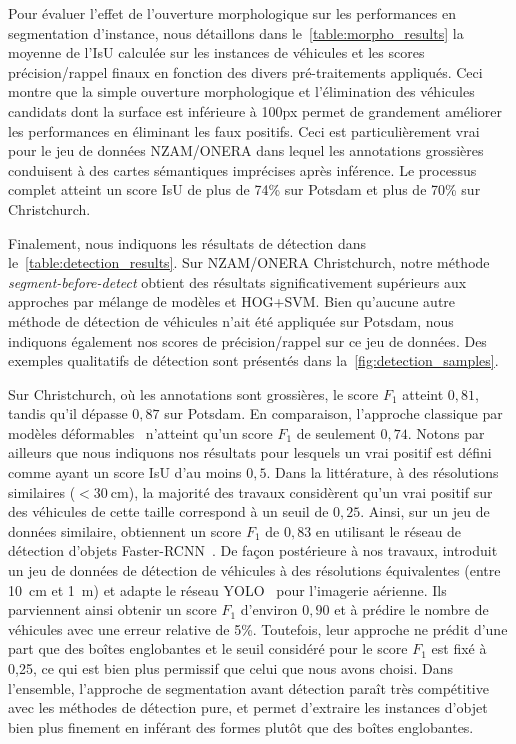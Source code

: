 Pour évaluer l'effet de l'ouverture morphologique sur les performances en segmentation d'instance, nous détaillons dans le~\cref{table:morpho_results} la moyenne de l'\gls{IsU} calculée sur les instances de véhicules et les scores précision/rappel finaux en fonction des divers pré-traitements appliqués. Ceci montre que la simple ouverture morphologique et l'élimination des véhicules candidats dont la surface est inférieure à 100px permet de grandement améliorer les performances en éliminant les faux positifs. Ceci est particulièrement vrai pour le jeu de données NZAM/ONERA dans lequel les annotations grossières conduisent à des cartes sémantiques imprécises après inférence. Le processus complet atteint un score \gls{IsU} de plus de 74\% sur Potsdam et plus de 70\% sur Christchurch.

Finalement, nous indiquons les résultats de détection dans le~\cref{table:detection_results}. Sur NZAM/ONERA Christchurch, notre méthode \textit{segment-before-detect} obtient des résultats significativement supérieurs aux approches par mélange de modèles et \gls{HOG}+\gls{SVM}. Bien qu'aucune autre méthode de détection de véhicules n'ait été appliquée sur Potsdam, nous indiquons également nos scores de précision/rappel sur ce jeu de données. Des exemples qualitatifs de détection sont présentés dans la~\cref{fig:detection_samples}.

 Sur Christchurch, où les annotations sont grossières, le score $F_1$ atteint $0,81$, tandis qu'il dépasse $0,87$ sur Potsdam. En comparaison, l'approche classique par modèles déformables~\cite{randrianarivo_urban_2013} n'atteint qu'un score $F_1$ de seulement $0,74$. Notons par ailleurs que nous indiquons nos résultats pour lesquels un vrai positif est défini comme ayant un score \gls{IsU} d'au moins $0,5$. Dans la littérature, à des résolutions similaires ($<\SI{30}{\centi\meter}$), la majorité des travaux considèrent qu'un vrai positif sur des véhicules de cette taille correspond à un seuil de $0,25$. Ainsi, sur un jeu de données similaire, \citet{tang_vehicle_2017} obtiennent un score $F_1$ de $0,83$ en utilisant le réseau de détection d'objets Faster-RCNN~\cite{ren_faster_2017}. De façon postérieure à nos travaux, \citet{van_etten_you_2018} introduit un jeu de données de détection de véhicules à des résolutions équivalentes (entre \SI{10}{\centi\meter} et \SI{1}{\meter}) et adapte le réseau YOLO~\cite{redmon_you_2016} pour l'imagerie aérienne. Ils parviennent ainsi obtenir un score $F_1$ d'environ $0,90$ et à prédire le nombre de véhicules avec une erreur relative de 5\%. Toutefois, leur approche ne prédit d'une part que des boîtes englobantes et le seuil considéré pour le score $F_1$ est fixé à 0,25, ce qui est bien plus permissif que celui que nous avons choisi. Dans l'ensemble, l'approche de segmentation avant détection paraît très compétitive avec les méthodes de détection pure, et permet d'extraire les instances d'objet bien plus finement en inférant des formes plutôt que des boîtes englobantes.


